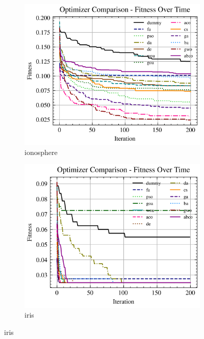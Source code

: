 \begin{figure}[htp]
    \begin{subfigure}[htp]{0.45\textwidth}
        \includegraphics[width=\textwidth]{imagenes/fitness_charts/img/binary/ionosphere/optimizers_fitness_knn.png}
        \caption{ionosphere}
    \end{subfigure}
    \begin{subfigure}[htp]{0.45\textwidth}
        \includegraphics[width=\textwidth]{imagenes/fitness_charts/img/binary/iris/optimizers_fitness_knn.png}
        \caption{iris}
    \end{subfigure}


\end{figure}
